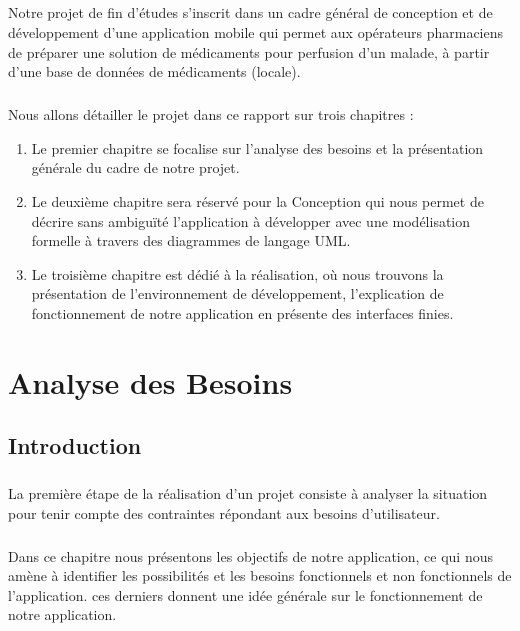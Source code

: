 \documentclass[12pt, openany]{report}
\begin{document}
\paragraph{}
Notre projet de fin d'études s'inscrit dans un cadre général de conception et de développement d'une application mobile qui permet aux opérateurs pharmaciens de préparer une solution de médicaments pour perfusion d'un malade, à partir d'une base de données de médicaments (locale).
\paragraph{}
Nous allons détailler le projet dans ce rapport sur trois chapitres :
\begin{enumerate}
	\item  Le premier chapitre se focalise sur l'analyse des besoins et la présentation générale du cadre de notre projet.
	\item Le deuxième chapitre sera réservé pour la Conception qui nous permet de décrire sans ambiguïté l'application à développer avec une modélisation formelle à travers des diagrammes de langage UML.
	\item Le troisième chapitre est dédié à la réalisation, où nous trouvons la présentation de l'environnement de développement, l’explication de fonctionnement de notre application en présente des  interfaces finies.
\end{enumerate}



\chapter{Analyse des Besoins}
\newpage
\section{Introduction}
\large
\paragraph{} La première étape de la réalisation d'un projet consiste à analyser la situation pour tenir compte des contraintes répondant aux besoins d'utilisateur.
\paragraph{} Dans ce chapitre nous présentons les objectifs de notre application,  ce qui nous amène à
identifier les possibilités et les besoins fonctionnels et non fonctionnels de l’application. ces derniers donnent une idée générale sur le fonctionnement de notre application.
\end{document}
